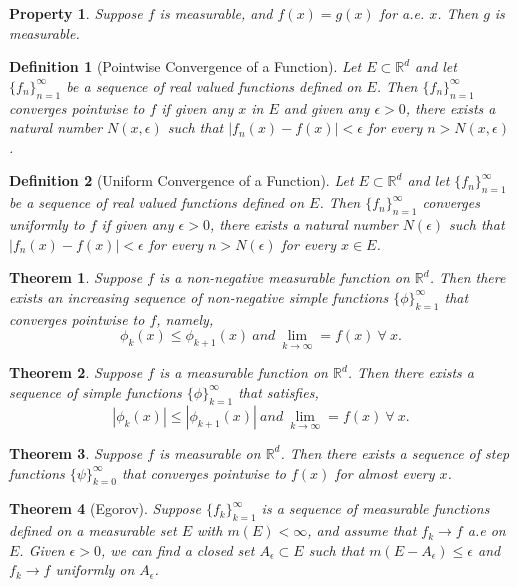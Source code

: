 \documentclass{report}
\theoremstyle{upthm}
\newtheorem{thm}{Theorem}
\newtheorem{defn}{Definition}
\newtheorem{property}{Property}
\newcommand{\reals}{\mathbb{R}}
\newcommand{\set}[1]{\big\lbrace #1 \big\rbrace}
\begin{document}
\begin{property}
	Suppose $f$ is measurable, and $f(x) = g(x)$ for a.e. $x$. Then $g$ is measurable.
\end{property}

\begin{defn}[Pointwise Convergence of a Function]
	Let $E \subset \reals^d$ and let $\set{f_n}_{n=1}^{\infty}$ be a sequence of real valued functions defined on $E$. Then $\set{f_n}_{n=1}^\infty$ converges pointwise to $f$ if given any $x$ in $E$ and	given any $\epsilon > 0$, there exists a natural number $N(x, \epsilon)$ such that $|f_n(x) - f(x)| < \epsilon$ for every $n > N(x, \epsilon)$.
\end{defn}

\begin{defn}[Uniform Convergence of a Function]
	Let $E \subset \reals^d$ and let $\set{f_n}_{n=1}^{\infty}$ be a sequence of real valued functions defined on $E$. Then $\set{f_n}_{n=1}^\infty$ converges uniformly to $f$ if given any $\epsilon > 0$, there exists a natural number $N(\epsilon)$ such that $|f_n(x) - f(x)| < \epsilon$ for every $n > N(\epsilon)$ for every $x \in E$.
\end{defn}

\begin{thm}
	Suppose $f$ is a non-negative measurable function on $\reals^d$. Then there exists an increasing sequence of non-negative simple functions $\set{\phi}_{k=1}^{\infty} $ that converges pointwise to $f$, namely,
	$$ \phi_k (x) \leq \phi_{k+1} (x)\ and\ \lim_{k \rightarrow \infty} = f(x)\ \forall\ x.$$
\end{thm}

\begin{thm}
	Suppose $f$ is a measurable function on $\reals^d$. Then there exists a sequence of simple functions $\set{\phi}_{k=1}^{\infty} $ that satisfies,
	$$ |\phi_k (x)| \leq |\phi_{k+1} (x)| \ and\ \lim_{k \rightarrow \infty} = f(x)\ \forall\ x.$$
\end{thm}

\begin{thm}
	Suppose $f$ is measurable on $\reals^d$. Then there exists a sequence of step functions $\set{\psi}_{k=0}^\infty$ that converges pointwise to $f(x)$ for almost every $x$.
\end{thm}

\begin{thm}[Egorov]
	Suppose $\set{f_k}_{k=1}^\infty$ is a sequence of measurable functions defined on a measurable set $E$ with $m(E) < \infty $, and assume that $f_k \rightarrow f$ a.e on $E$. Given $\epsilon > 0 $, we can find a closed set $A_\epsilon \subset E$ such that $m(E - A_\epsilon) \leq \epsilon$ and $f_k \rightarrow f$ uniformly on $A_\epsilon$.
\end{thm}
\end{document}
